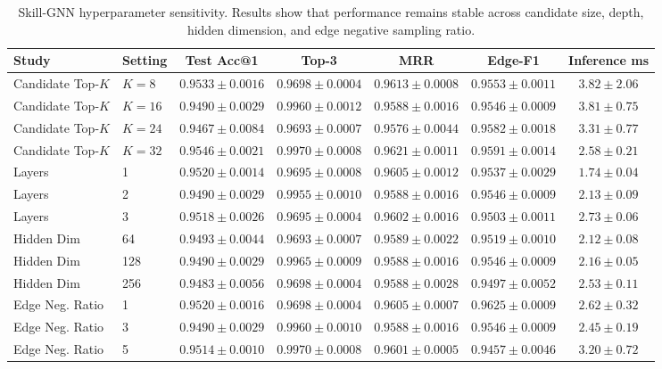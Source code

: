 \documentclass[letterpaper]{article}
\begin{document}
\begin{table}[t]
\centering
\small
\begin{tabular}{llccccc}
\toprule
Study & Setting & Test Acc@1 & Top-3 & MRR & Edge-F1 & Inference ms \\
\midrule
Candidate Top-$K$ & $K=8$  & $0.9533{\pm}0.0016$ & $0.9698{\pm}0.0004$ & $0.9613{\pm}0.0008$ & $0.9553{\pm}0.0011$ & $3.82{\pm}2.06$ \\
Candidate Top-$K$ & $K=16$ & $0.9490{\pm}0.0029$ & $\mathbf{0.9960{\pm}0.0012}$ & $0.9588{\pm}0.0016$ & $0.9546{\pm}0.0009$ & $3.81{\pm}0.75$ \\
Candidate Top-$K$ & $K=24$ & $0.9467{\pm}0.0084$ & $0.9693{\pm}0.0007$ & $0.9576{\pm}0.0044$ & $0.9582{\pm}0.0018$ & $3.31{\pm}0.77$ \\
Candidate Top-$K$ & $K=32$ & $\mathbf{0.9546{\pm}0.0021}$ & $\mathbf{0.9970{\pm}0.0008}$ & $\mathbf{0.9621{\pm}0.0011}$ & $\mathbf{0.9591{\pm}0.0014}$ & $\mathbf{2.58{\pm}0.21}$ \\
\midrule
Layers & 1 & $\mathbf{0.9520{\pm}0.0014}$ & $0.9695{\pm}0.0008$ & $\mathbf{0.9605{\pm}0.0012}$ & $0.9537{\pm}0.0029$ & $\mathbf{1.74{\pm}0.04}$ \\
Layers & 2 & $0.9490{\pm}0.0029$ & $\mathbf{0.9955{\pm}0.0010}$ & $0.9588{\pm}0.0016$ & $\mathbf{0.9546{\pm}0.0009}$ & $2.13{\pm}0.09$ \\
Layers & 3 & $0.9518{\pm}0.0026$ & $0.9695{\pm}0.0004$ & $0.9602{\pm}0.0016$ & $0.9503{\pm}0.0011$ & $2.73{\pm}0.06$ \\
\midrule
Hidden Dim & 64  & $\mathbf{0.9493{\pm}0.0044}$ & $0.9693{\pm}0.0007$ & $\mathbf{0.9589{\pm}0.0022}$ & $0.9519{\pm}0.0010$ & $\mathbf{2.12{\pm}0.08}$ \\
Hidden Dim & 128 & $0.9490{\pm}0.0029$ & $\mathbf{0.9965{\pm}0.0009}$ & $0.9588{\pm}0.0016$ & $\mathbf{0.9546{\pm}0.0009}$ & $2.16{\pm}0.05$ \\
Hidden Dim & 256 & $0.9483{\pm}0.0056$ & $0.9698{\pm}0.0004$ & $0.9588{\pm}0.0028$ & $0.9497{\pm}0.0052$ & $2.53{\pm}0.11$ \\
\midrule
Edge Neg. Ratio & 1 & $\mathbf{0.9520{\pm}0.0016}$ & $0.9698{\pm}0.0004$ & $\mathbf{0.9605{\pm}0.0007}$ & $\mathbf{0.9625{\pm}0.0009}$ & $2.62{\pm}0.32$ \\
Edge Neg. Ratio & 3 & $0.9490{\pm}0.0029$ & $\mathbf{0.9960{\pm}0.0010}$ & $0.9588{\pm}0.0016$ & $0.9546{\pm}0.0009$ & $\mathbf{2.45{\pm}0.19}$ \\
Edge Neg. Ratio & 5 & $0.9514{\pm}0.0010$ & $\mathbf{0.9970{\pm}0.0008}$ & $0.9601{\pm}0.0005$ & $0.9457{\pm}0.0046$ & $3.20{\pm}0.72$ \\
\bottomrule
\end{tabular}
\caption{Skill-GNN hyperparameter sensitivity. Results show that performance remains stable across candidate size, depth, hidden dimension, and edge negative sampling ratio.}
\label{tab:gnn-hyperparams}
\end{table}
\end{document}
